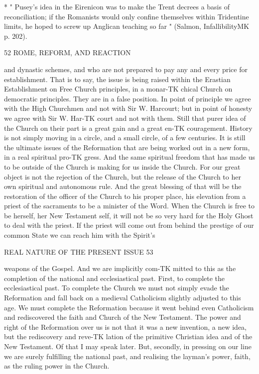 \documentclass[12pt,a5paper,oneside]{book}
\begin{document}
* " Pusey's idea in the Eirenicon was to make the Trent decrees 
a basis of reconciliation; if the Romanists would only confine 
themselves within Tridentine limits, he hoped to screw up Anglican 
teaching so far " (Salmon, InfallibilityMK p. 202). 



52 ROME, REFORM, AND REACTION 

and dynastic schemes, and who are not prepared to 
pay any and every price for establishment. That is 
to say, the issue is being raised within the Erastian 
Establishment on Free Church principles, in a monar-TK
chical Church on democratic principles. They are in 
a false position. In point of principle we agree with 
the High Churchmen and not with Sir W. Harcourt; 
but in point of honesty we agree with Sir W. Har-TK
court and not with them. Still that purer idea of the 
Church on their part is a great gain and a great en-TK
couragement. History is not simply moving in a 
circle, and a small circle, of a few centuries. It is still 
the ultimate issues of the Reformation that are being 
worked out in a new form, in a real spiritual pro-TK
gress. And the same spiritual freedom that has made 
us to be outside of the Church is making for us inside 
the Church. For our great object is not the rejection 
of the Church, but the release of the Church to her 
own spiritual and autonomous rule. And the great 
blessing of that will be the restoration of the officer 
of the Church to his proper place, his elevation from 
a priest of the sacraments to be a minister of the 
Word. When the Church is free to be herself, her 
New Testament self, it will not be so very hard for 
the Holy Ghost to deal with the priest. If the priest 
will come out from behind the prestige of our 
common State we can reach him with the Spirit's 



REAL NATURE OF THE PRESENT ISSUE 53 

weapons of the Gospel. And we are implicitly com-TK
mitted to this as the completion of the national and 
ecclesiastical past. First, to complete the ecclesiastical 
past. To complete the Church we must not simply 
evade the Reformation and fall back on a medieval 
Catholicism slightly adjusted to this age. We must 
complete the Reformation because it went behind even 
Catholicism and rediscovered the faith and Church 
of the New Testament. The power and right of 
the Reformation over us is not that it was a new 
invention, a new idea, but the rediscovery and reve-TK
lation of the primitive Christian idea and of the New 
Testament. Of that I may speak later. But, secondly, 
in pressing on our line we are surely fulfilling the 
national past, and realising the layman's power, faith, 
as the ruling power in the Church. 
\end{document}
